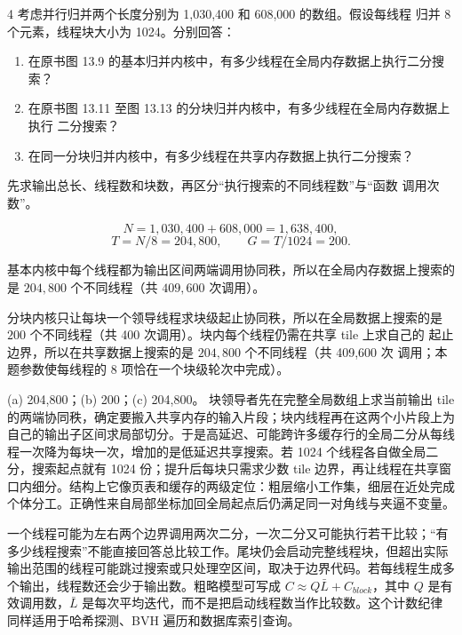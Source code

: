 \begin{solutionexercise}{4}
\problemheading 考虑并行归并两个长度分别为 1,030,400 和 608,000 的数组。假设每线程
归并 8 个元素，线程块大小为 1024。分别回答：
\begin{enumerate}[label=(\alph*)]
  \item 在原书图 13.9 的基本归并内核中，有多少线程在全局内存数据上执行二分搜索？
  \item 在原书图 13.11 至图 13.13 的分块归并内核中，有多少线程在全局内存数据上执行
  二分搜索？
  \item 在同一分块归并内核中，有多少线程在共享内存数据上执行二分搜索？
\end{enumerate}

\approachheading 先求输出总长、线程数和块数，再区分“执行搜索的不同线程数”与“函数
调用次数”。

\answerheading
\[
N=1{,}030{,}400+608{,}000=1{,}638{,}400,
\]
\[
T=N/8=204{,}800,\qquad G=T/1024=200.
\]

基本内核中每个线程都为输出区间两端调用协同秩，所以在全局内存数据上搜索的是
$\boxed{204{,}800}$ 个不同线程（共 $409{,}600$ 次调用）。

分块内核只让每块一个领导线程求块级起止协同秩，所以在全局数据上搜索的是
$\boxed{200}$ 个不同线程（共 400 次调用）。块内每个线程仍需在共享 tile 上求自己的
起止边界，所以在共享数据上搜索的是 $\boxed{204{,}800}$ 个不同线程（共 409,600 次
调用；本题参数使每线程的 8 项恰在一个块级轮次中完成）。

\conclusionheading (a) 204,800；(b) 200；(c) 204,800。
\discussionheading
{}块领导者先在完整全局数组上求当前输出 tile 的两端协同秩，确定要搬入共享内存的输入片段；块内线程再在这两个小片段上为自己的输出子区间求局部切分。于是高延迟、可能跨许多缓存行的全局二分从每线程一次降为每块一次，增加的是低延迟共享搜索。若 1024 个线程各自做全局二分，搜索起点就有 1024 份；提升后每块只需求少数 tile 边界，再让线程在共享窗口内细分。结构上它像页表和缓存的两级定位：粗层缩小工作集，细层在近处完成个体分工。正确性来自局部坐标加回全局起点后仍满足同一对角线与夹逼不变量。

一个线程可能为左右两个边界调用两次二分，一次二分又可能执行若干比较；“有多少线程搜索”不能直接回答总比较工作。尾块仍会启动完整线程块，但超出实际输出范围的线程可能跳过搜索或只处理空区间，取决于边界代码。若每线程生成多个输出，线程数还会少于输出数。粗略模型可写成 $C\approx Q\bar L+C_{block}$，其中 $Q$ 是有效调用数，$\bar L$ 是每次平均迭代，而不是把启动线程数当作比较数。这个计数纪律同样适用于哈希探测、BVH 遍历和数据库索引查询。


\end{solutionexercise}
